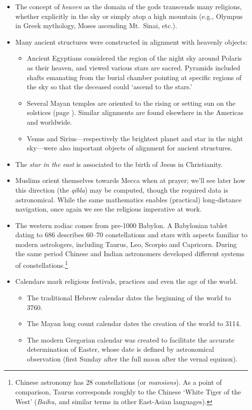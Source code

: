 \begin{itemize}
	\item The concept of \emph{heaven} as the domain of the gods transcends many religions, whether explicitly in the sky or simply atop a high mountain (e.g., Olympus in Greek mythology, Moses ascending Mt.\ Sinai, etc.).
	\item Many ancient structures were constructed in alignment with heavenly objects:
	\begin{itemize}
	  \item Ancient Egyptians considered the region of the night sky around Polaris as their heaven, and viewed various stars are sacred. Pyramids included shafts emanating from the burial chamber pointing at specific regions of the sky so that the deceased could `ascend to the stars.' 
		\item Several Mayan temples are oriented to the rising or setting sun on the solstices (page \pageref{ssec:astro1}). Similar alignments are found elsewhere in the Americas and worldwide.
		\item Venus and Sirius---respectively the brightest planet and star in the night sky---were also important objects of alignment for ancient structures.
	\end{itemize}
	
	\item The \emph{star in the east} is associated to the birth of Jesus in Christianity.
	
	\item Muslims orient themselves towards Mecca when at prayer; we'll see later how this direction (the \emph{qibla}) may be computed, though the required data is astronomical. While the same mathematics enables (practical) long-distance navigation, once again we see the religious imperative at work. 
	
	\item The western zodiac comes from pre-1000\BC{} Babylon. A Babylonian tablet dating to 686\BC{} describes 60--70 constellations and stars with aspects familiar to modern astrologers, including Taurus, Leo, Scorpio and Capricorn. During the same period Chinese and Indian astronomers developed different systems of constellations.\footnote{%
	Chinese astronomy has 28 constellations (or \emph{mansions}). As a point of comparison, Taurus corresponds roughly to the Chinese `White Tiger of the West' (\emph{Baihu,} and similar terms in other East-Asian languages).%
}
	\item Calendars mark religious festivals, practices and even the age of the world.
	\begin{itemize}
	  \item The traditional Hebrew calendar dates the beginning of the world to 3760\BC.
	  \item The Mayan long count calendar dates the creation of the world to 3114\BC.
	  \item The modern Gregorian calendar was created to facilitate the accurate determination of Easter, whose date is defined by astronomical observation (first Sunday after the full moon after the vernal equinox).
	\end{itemize}
\end{itemize}


